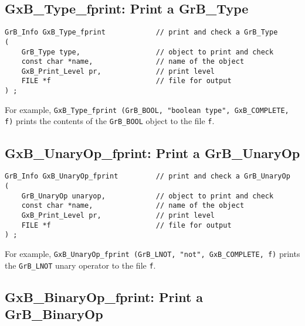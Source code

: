 \documentclass[12pt]{article}
\begin{document}
\subsection{{\sf GxB\_Type\_fprint:} Print a {\sf GrB\_Type}}

\begin{mdframed}[userdefinedwidth=6in]
{\footnotesize
\begin{verbatim}
GrB_Info GxB_Type_fprint            // print and check a GrB_Type
(
    GrB_Type type,                  // object to print and check
    const char *name,               // name of the object
    GxB_Print_Level pr,             // print level
    FILE *f                         // file for output
) ;
\end{verbatim} } \end{mdframed}

For example, \verb'GxB_Type_fprint (GrB_BOOL, "boolean type", GxB_COMPLETE, f)'
prints the contents of the \verb'GrB_BOOL' object to the file \verb'f'.

\newpage
\subsection{{\sf GxB\_UnaryOp\_fprint:} Print a {\sf GrB\_UnaryOp}}

\begin{mdframed}[userdefinedwidth=6in]
{\footnotesize
\begin{verbatim}
GrB_Info GxB_UnaryOp_fprint         // print and check a GrB_UnaryOp
(
    GrB_UnaryOp unaryop,            // object to print and check
    const char *name,               // name of the object
    GxB_Print_Level pr,             // print level
    FILE *f                         // file for output
) ;
\end{verbatim} } \end{mdframed}

For example,
\verb'GxB_UnaryOp_fprint (GrB_LNOT, "not", GxB_COMPLETE, f)'
prints the \verb'GrB_LNOT' unary operator to the file \verb'f'.


\subsection{{\sf GxB\_BinaryOp\_fprint:} Print a {\sf GrB\_BinaryOp}}
\end{document}
